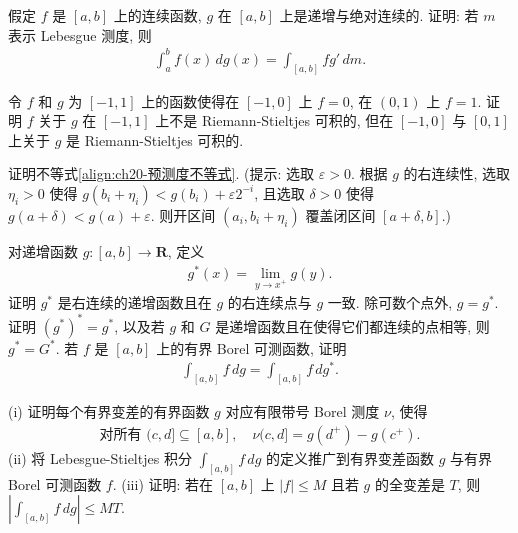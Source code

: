 \documentclass[../../main.tex]{subfiles}
\begin{document}
\begin{exercise}\label{exercise:ch20-37}
假定 $f$ 是 $[a,b]$ 上的连续函数, $g$ 在 $[a,b]$ 上是递增与绝对连续的. 证明: 若 $m$ 表示 Lebesgue 测度, 则
\begin{align*}
\int_{a}^{b}f(x)\,dg(x)=\int_{[a,b]}fg'\,dm.
\end{align*}
\end{exercise}

\begin{exercise}\label{exercise:ch20-38}
令 $f$ 和 $g$ 为 $[-1,1]$ 上的函数使得在 $[-1,0]$ 上 $f=0$, 在 $(0,1)$ 上 $f=1$. 证明 $f$ 关于 $g$ 在 $[-1,1]$ 上不是 Riemann-Stieltjes 可积的, 但在 $[-1,0]$ 与 $[0,1]$ 上关于 $g$ 是 Riemann-Stieltjes 可积的.
\end{exercise}

\begin{exercise}\label{exercise:ch20-39}
证明不等式\eqref{align:ch20-预测度不等式}. (提示: 选取 $\varepsilon>0$. 根据 $g$ 的右连续性, 选取 $\eta_{i}>0$ 使得 $g(b_{i}+\eta_{i})<g(b_{i})+\varepsilon 2^{-i}$, 且选取 $\delta>0$ 使得 $g(a+\delta)<g(a)+\varepsilon$. 则开区间 $(a_{i},b_{i}+\eta_{i})$ 覆盖闭区间 $[a+\delta,b]$.)
\end{exercise}

\begin{exercise}\label{exercise:ch20-40}
对递增函数 $g:[a,b]\to\mathbf{R}$, 定义
\begin{align*}
g^{*}(x)=\lim_{y\to x^{+}}g(y).
\end{align*}
证明 $g^{*}$ 是右连续的递增函数且在 $g$ 的右连续点与 $g$ 一致. 除可数个点外, $g=g^{*}$. 证明 $(g^{*})^{*}=g^{*}$, 以及若 $g$ 和 $G$ 是递增函数且在使得它们都连续的点相等, 则 $g^{*}=G^{*}$. 若 $f$ 是 $[a,b]$ 上的有界 Borel 可测函数, 证明
\begin{align*}
\int_{[a,b]}f\,dg=\int_{[a,b]}f\,dg^{*}.
\end{align*}
\end{exercise}

\begin{exercise}\label{exercise:ch20-41}
(i) 证明每个有界变差的有界函数 $g$ 对应有限带号 Borel 测度 $\nu$, 使得
\begin{align*}
\text{对所有 }(c,d]\subseteq[a,b],\quad\nu(c,d]=g(d^{+})-g(c^{+}).
\end{align*}
(ii) 将 Lebesgue-Stieltjes 积分 $\int_{[a,b]}f\,dg$ 的定义推广到有界变差函数 $g$ 与有界 Borel 可测函数 $f$.
(iii) 证明: 若在 $[a,b]$ 上 $|f|\leqslant M$ 且若 $g$ 的全变差是 $T$, 则 $|\int_{[a,b]}f\,dg|\leqslant MT$.
\end{exercise}
\end{document}
